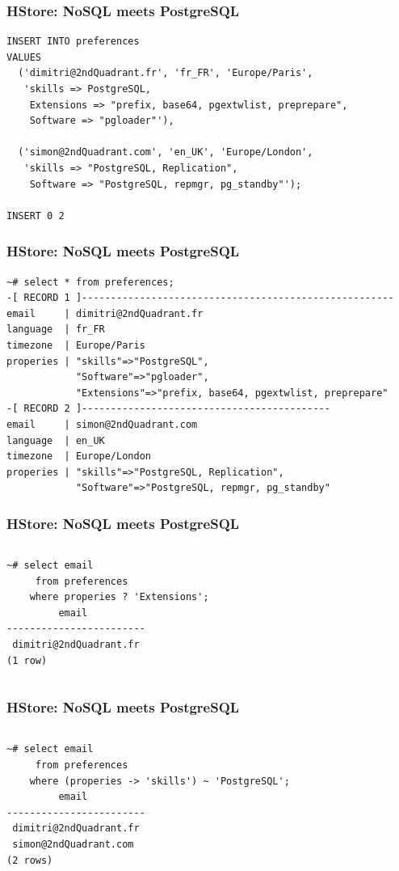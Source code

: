 \documentclass{beamer}
\begin{document}
\begin{frame}[fragile]
  \frametitle{HStore: NoSQL meets PostgreSQL}

\begin{verbatim}
INSERT INTO preferences
VALUES
  ('dimitri@2ndQuadrant.fr', 'fr_FR', 'Europe/Paris',
   'skills => PostgreSQL,
    Extensions => "prefix, base64, pgextwlist, preprepare",
    Software => "pgloader"'),

  ('simon@2ndQuadrant.com', 'en_UK', 'Europe/London',
   'skills => "PostgreSQL, Replication",
    Software => "PostgreSQL, repmgr, pg_standby"');

INSERT 0 2
\end{verbatim}  
\end{frame}

\begin{frame}[fragile]
  \frametitle{HStore: NoSQL meets PostgreSQL}

\begin{verbatim}
~# select * from preferences;
-[ RECORD 1 ]------------------------------------------------------
email     | dimitri@2ndQuadrant.fr
language  | fr_FR
timezone  | Europe/Paris
properies | "skills"=>"PostgreSQL",
            "Software"=>"pgloader",
            "Extensions"=>"prefix, base64, pgextwlist, preprepare"
-[ RECORD 2 ]-------------------------------------------
email     | simon@2ndQuadrant.com
language  | en_UK
timezone  | Europe/London
properies | "skills"=>"PostgreSQL, Replication",
            "Software"=>"PostgreSQL, repmgr, pg_standby"
\end{verbatim}  
\end{frame}

\begin{frame}[fragile]
  \frametitle{HStore: NoSQL meets PostgreSQL}

\begin{columns}
\begin{verbatim}
~# select email
     from preferences
    where properies ? 'Extensions';
         email          
------------------------
 dimitri@2ndQuadrant.fr
(1 row)
\end{verbatim}  
\end{columns}
\end{frame}

\begin{frame}[fragile]
  \frametitle{HStore: NoSQL meets PostgreSQL}

\begin{columns}
\begin{verbatim}
~# select email
     from preferences
    where (properies -> 'skills') ~ 'PostgreSQL';
         email          
------------------------
 dimitri@2ndQuadrant.fr
 simon@2ndQuadrant.com
(2 rows)
\end{verbatim}  
\end{columns}
\end{frame}
\end{document}
